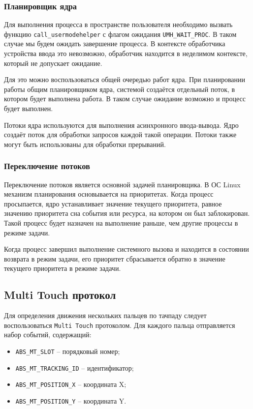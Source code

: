 \subsubsection{Планировщик ядра}

Для выполнения процесса в пространстве пользователя необходимо вызвать функцию \texttt{call\_usermodehelper} с флагом ожидания \texttt{UMH\_WAIT\_PROC}. В таком случае мы будем ожидать завершение процесса. В контексте обработчика устройства ввода это невозможно, обработчик находится в неделимом контексте, который не допускает ожидание.

Для это можно воспользоваться общей очередью работ ядра. При планировании работы общим планировщиком ядра, системой создаётся отдельный поток, в котором будет выполнена работа. В таком случае ожидание возможно и процесс будет выполнен.

Потоки ядра используются для выполнения асинхронного ввода-вывода. Ядро создаёт поток для обработки запросов каждой такой операции. Потоки также могут быть использованы для обработки прерываний.

\subsubsection{Переключение потоков}

Переключение потоков является основной задачей планировщика. В ОС Linux механизм планирования основывается на приоритетах. Когда процесс просыпается, ядро устанавливает значение текущего приоритета, равное значению приоритета сна события или ресурса, на котором он был заблокирован. Такой процесс будет назначен на выполнение раньше, чем другие процессы в режиме задачи.

Когда процесс завершил выполнение системного вызова и находится в состоянии возврата в режим задачи, его приоритет сбрасывается обратно в значение текущего приоритета в режиме задачи.

\subsection{Multi Touch протокол}

Для определения движения нескольких пальцев по тачпаду следует воспользоваться \texttt{Multi Touch} протоколом. Для каждого пальца отправляется набор событий, содержащий: 

\begin{itemize}
	\item \texttt{ABS\_MT\_SLOT} -- порядковый номер;
	\item \texttt{ABS\_MT\_TRACKING\_ID} -- идентификатор;
	\item \texttt{ABS\_MT\_POSITION\_X} -- координата X;
	\item \texttt{ABS\_MT\_POSITION\_Y} -- координата Y.
\end{itemize}

